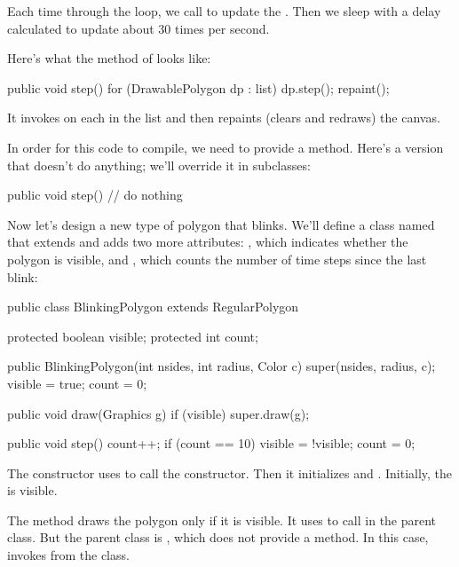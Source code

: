 Each time through the loop, we call  to update the .
Then we sleep with a delay calculated to update about 30 times per second.

Here's what the  method of  looks like:

\begin{code}
public void step() {
    for (DrawablePolygon dp : list) {
        dp.step();
    }
    repaint();
}
\end{code}

It invokes  on each  in the list and then repaints (clears and redraws) the canvas.

In order for this code to compile, we need  to provide a  method.
Here's a version that doesn't do anything; we'll override it in subclasses:

\begin{code}
public void step() {
    // do nothing
}
\end{code}

Now let's design a new type of polygon that blinks.
We'll define a class named  that extends  and adds two more attributes: , which indicates whether the polygon is visible, and , which counts the number of time steps since the last blink:

\begin{code}
public class BlinkingPolygon extends RegularPolygon {
    protected boolean visible;
    protected int count;

    public BlinkingPolygon(int nsides, int radius, Color c) {
        super(nsides, radius, c);
        visible = true;
        count = 0;
    }

    public void draw(Graphics g) {
        if (visible) {
            super.draw(g);
        }
    }

    public void step() {
        count++;
        if (count == 10) {
            visible = !visible;
            count = 0;
        }
    }
}
\end{code}

The constructor uses  to call the  constructor.
Then it initializes  and .
Initially, the  is visible.

The  method draws the polygon only if it is visible.
It uses  to call  in the parent class.
But the parent class is , which does not provide a  method.
In this case,  invokes  from the  class.

